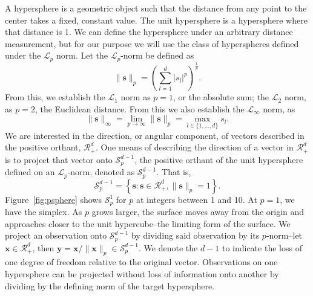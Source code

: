 A hypersphere is a geometric object such that the distance from any point to the center takes a fixed,
  constant value.  The unit hypersphere is a hypersphere where that distance is 1. We can define the
  hypersphere under an arbitrary distance measurement, but for our purpose we will use the class of
  hyperspheres defined under the $\mathcal{L}_p$ norm. Let the $\mathcal{L}_p$-norm be defined as
  \begin{equation*}
    \lVert \bm{s} \rVert_p = \left({\textstyle\sum}_{l = 1}^d \lvert s_l\rvert^p\right)^{\frac{1}{p}}.
  \end{equation*}
  From this, we establish the $\mathcal{L}_1$ norm as $p = 1$, or the absolute sum; the
  $\mathcal{L}_2$ norm, as $p = 2$, the Euclidean distance.  From this we also establish the
  $\mathcal{L}_{\infty}$ norm, as
  \begin{equation*}
    \lVert \bm{s} \rVert_{\infty}
      = \lim\limits_{p\to\infty} \lVert \bm{s} \rVert_p
      = \max_{l\in\lbrace1,\ldots,d\rbrace}s_l.
  \end{equation*}
  We are interested in the direction, or angular component, of vectors described in the positive
  orthant, $\mathcal{R}_{+}^d$.  One means of describing the direction of a vector in $\mathcal{R}_+^d$
  is to project that vector onto $\mathcal{S}_{p}^{d-1}$, the positive orthant of the unit hypersphere
  defined on an $\mathcal{L}_p$-norm, denoted as $\mathcal{S}_{p}^{d-1}$.  That is,
  \begin{equation*}
    \mathcal{S}_{p}^{d-1} = \left\lbrace \bm{s} : \bm{s} \in \mathcal{R}_{+}^{d}, \lVert \bm{s}\rVert_{p} = 1\right\rbrace.
  \end{equation*}
  Figure~\ref{fig:psphere} shows $\mathcal{S}_{p}^{1}$ for $p$ at integers between 1 and 10.  At $p = 1$, we have the simplex.  As $p$ grows larger, the surface moves away from the origin and approaches closer to the unit hypercube--the limiting form of the surface. We project an observation onto $\mathcal{S}_p^{d-1}$ by dividing said observation by its $p$-norm--let  $\bm{x}\in \mathcal{R}_{+}^{d}$, then $\bm{y} = \bm{x} / \lVert \bm{x}\rVert_p \in \mathcal{S}_{p}^{d-1}$.
  We denote the $d-1$ to indicate the loss of one degree of freedom relative to the original vector.
  Observations on one hypersphere can be projected without loss of information onto another by
  dividing by the defining norm of the target hypersphere.
  
